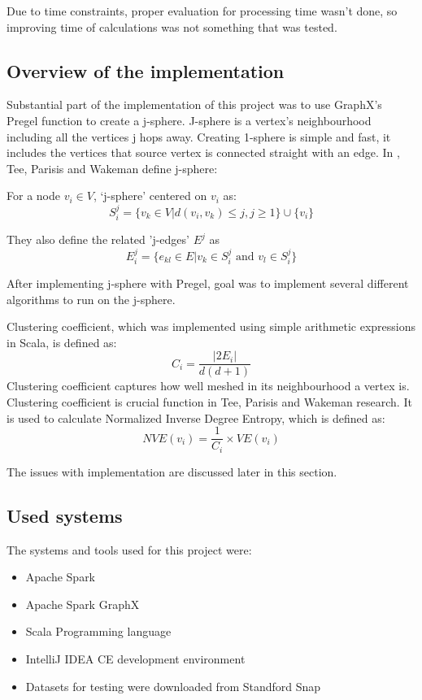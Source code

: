 \documentclass{article}
\theoremstyle{definition}
\begin{document}
Due to time constraints, proper evaluation for processing time wasn't done, so improving time of calculations was not something that was tested.  

\subsection{Overview of the implementation}
Substantial part of the implementation of this project was to use GraphX's Pregel function to create a j-sphere. J-sphere is a vertex's neighbourhood including all the vertices j hops away. Creating 1-sphere is simple and fast, it includes the vertices that source vertex is connected straight with an edge. In \cite{Tee2016b}, Tee, Parisis and Wakeman define j-sphere:

For a node $v_{i} \in V$, `j-sphere'
  centered on $v_{i}$ as:
\begin{equation}\label{eqn:jsphere}
S^{j}_{i}= \{ v_{k} \in V | d(v_{i},v_{k}) \leq j, j \geq 1 \} \cup \{ v_{i} \}
\end{equation}

They also define the related 'j-edges' $E^{j}$ as
\begin{equation}
  E^{j}_{i}=\{ e_{kl} \in E | v_{k} \in S^{j}_{i} \mbox{ and  } v_{l} \in S^{j}_{i} \}
\end{equation}

After implementing j-sphere with Pregel, goal was to implement several different algorithms to run on the j-sphere. 

Clustering coefficient, which was implemented using simple arithmetic expressions in Scala, is defined as: 
\begin{equation}
C_{i} = \frac{|2E_{i}|}{d(d+1)}
\end{equation}
Clustering coefficient captures how well meshed in its neighbourhood a vertex is. Clustering coefficient is crucial function in Tee, Parisis and Wakeman research. It is used to calculate Normalized Inverse Degree Entropy, which is defined as:
\begin{equation}
NVE(v_{i}) = \frac{1}{C_{i}} \times VE(v_{i})
\end{equation} 

The issues with implementation are discussed later in this section. 

\subsection{Used systems}
The systems and tools used for this project were:
\begin{itemize}
\item Apache Spark
\item Apache Spark GraphX
\item Scala Programming language
\item IntelliJ IDEA CE development environment
\item Datasets for testing were downloaded from Standford Snap
\end{itemize}
\end{document}
